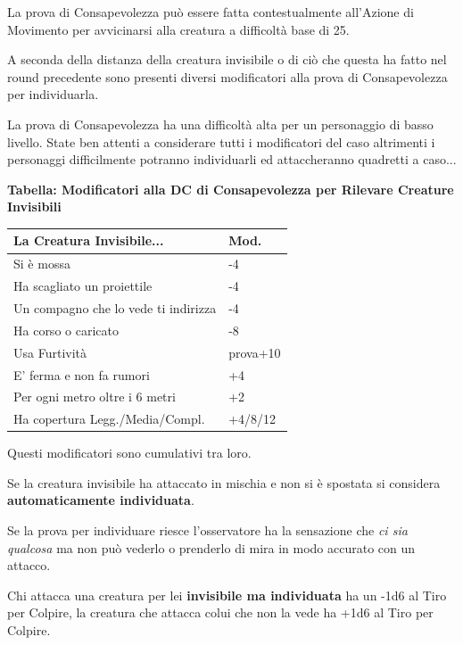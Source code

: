 \begin{multicols}{2}
La prova di Consapevolezza può essere fatta contestualmente all'Azione di Movimento per avvicinarsi alla creatura a difficoltà base di 25.

A seconda della distanza della creatura invisibile o di ciò che questa ha fatto nel round precedente sono presenti diversi modificatori alla prova di Consapevolezza per individuarla.

\medskip

\begin{narratore}[Invisibilità]
La prova di Consapevolezza ha una difficoltà alta per un personaggio di basso livello. State ben attenti a considerare tutti i modificatori del caso altrimenti i personaggi difficilmente potranno individuarli ed attaccheranno quadretti a caso...
\end{narratore}

\bigskip

\textbf{Tabella: Modificatori alla DC di Consapevolezza per Rilevare Creature Invisibili}

\medskip

\noindent\begin{tabularx}{\linewidth}{Xl}
	\toprule
\textbf{La Creatura Invisibile...} & \textbf{Mod.}\\
\toprule
Si è mossa& -4\\
Ha scagliato un proiettile & -4\\
Un compagno che lo vede ti indirizza & -4\\
Ha corso o caricato& -8\\
Usa Furtività & prova+10\\
E' ferma e non fa rumori & +4\\
Per ogni metro oltre i 6 metri & +2\\
Ha copertura Legg./Media/Compl. & +4/8/12
\end{tabularx}

\medskip

Questi modificatori sono cumulativi tra loro.

Se la creatura invisibile ha attaccato in mischia e non si è spostata si considera \textbf{automaticamente individuata}.

Se la prova per individuare riesce l'osservatore ha la sensazione che \emph{ci sia qualcosa} ma non può vederlo o prenderlo di mira in modo accurato con un attacco.

Chi attacca una creatura per lei \textbf{invisibile ma individuata} ha un -1d6 al Tiro per Colpire, la creatura che attacca colui che non la vede ha +1d6 al Tiro per Colpire.


\end{multicols}
